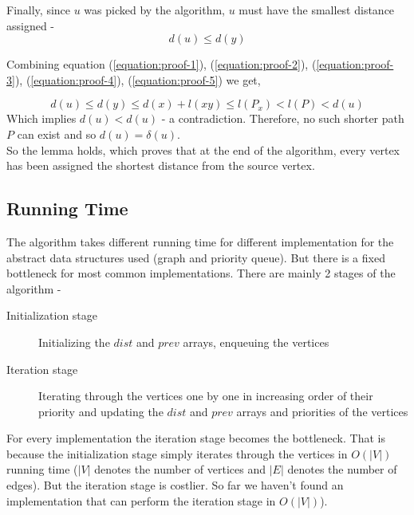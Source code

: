 \documentclass[12pt, a4paper]{article}
\begin{document}
Finally, since $u$ was picked by the algorithm, $u$ must have the smallest distance assigned -
\begin{equation}
    d(u) \leq d(y)
    \label{equation:proof-5}
\end{equation}

\noindent
Combining equation (\ref{equation:proof-1}), (\ref{equation:proof-2}), (\ref{equation:proof-3}), (\ref{equation:proof-4}), (\ref{equation:proof-5}) we get,

$$d(u) \leq d(y) \leq d(x) + l(xy) \leq l(P_x) < l(P) < d(u)$$
Which implies $d(u) < d(u)$ - a contradiction. Therefore, no such shorter path $P$ can exist and so $d(u) = \delta(u)$.\\

So the lemma holds, which proves that at the end of the algorithm, every vertex has been assigned the shortest distance from the source vertex.

\subsection{Running Time}
The algorithm takes different running time for different implementation for the abstract data structures used (graph and priority queue). But there is a fixed bottleneck for most common implementations. There are mainly 2 stages of the algorithm - 

\begin{description}
    \item[Initialization stage] Initializing the $dist$ and $prev$ arrays, enqueuing the vertices
    \item[Iteration stage] Iterating through the vertices one by one in increasing order of their priority and updating the $dist$ and $prev$ arrays and priorities of the vertices
\end{description}

\noindent
For every implementation the iteration stage becomes the bottleneck. That is because the initialization stage simply iterates through the vertices in $O(|V|)$ running time ($|V|$ denotes the number of vertices and $|E|$ denotes the number of edges). But the iteration stage is costlier. So far we haven't found an implementation that can perform the iteration stage in $O(|V|)$).
\\
\end{document}
